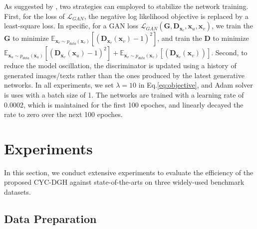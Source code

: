 \documentclass[10pt,journal,twocolumn]{IEEEtran}
\begin{document}
As suggested by \cite{CycleGAN}, two strategies can employed to stabilize the network training. First, for the loss of $\mathcal{L}_{GAN}$, the negative log likelihood objective is replaced by a least-square loss. In specific, for a GAN loss $\mathcal{L}_{GAN} (\boldsymbol G, \boldsymbol D_{\boldsymbol x_v}, \boldsymbol x_u, \boldsymbol x_v)$, we train the $\boldsymbol G$ to minimize $\mathbb{E}_{\boldsymbol x_v \sim p_{data} (\boldsymbol x_v)} [ (\boldsymbol D_{\boldsymbol x_v}(\boldsymbol x_v)-1)^2]$, and train the $\boldsymbol D$ to minimize $\mathbb{E}_{\boldsymbol x_u \sim p_{data} (\boldsymbol x_u)} [ ( \boldsymbol D_{\boldsymbol x_v}(\boldsymbol x_u) -1)^2] + \mathbb{E}_{\boldsymbol x_v \sim p_{data} (\boldsymbol x_v)} [ (\boldsymbol D_{\boldsymbol x_v}(\boldsymbol x_v))]$. Second, to reduce the model oscillation, the discriminator is updated using a history of generated images/texts rather than the ones produced by the latest generative networks. In all experiments, we set $\lambda=10$ in Eq.\eqref{eq:objective}, and Adam solver \cite{Adam-solver} is uses with a batch size of 1. The networks are trained with a learning rate of 0.0002, which is maintained for the first 100 epoches, and linearly decayed the rate to zero over the next 100 epoches.










\section{Experiments}\label{sec:exp}

In this section, we conduct extensive experiments to evaluate the efficiency of the proposed CYC-DGH against state-of-the-arts on three widely-used benchmark datasets.

\subsection{Data Preparation}
\end{document}
